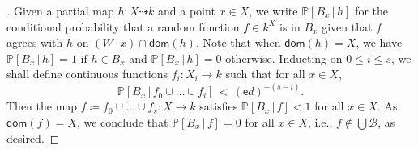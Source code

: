 \documentclass[11pt,reqno,psamsfonts]{amsart}
\theoremstyle{bfnote}
\theoremstyle{definition}
\theoremstyle{remark}
\newcommand{\0}{\varnothing}
\newcommand{\set}[1]{\{#1\}}
\renewcommand{\P}{\mathbb{P}}
\renewcommand{\leq}{\leqslant}
\newcommand{\defeq}{\coloneqq}
\newcommand{\red}[1]{{\color{red}#1}}
\newcommand{\todo}[1]{\red{\textbf{\upshape{[#1]}}}}
\newcommand{\emphd}[1]{{\fontseries{b}\selectfont\textsf{#1}}}
\newcommand{\pto}{\dashrightarrow}
\newcommand{\dom}{\mathsf{dom}}
\newcommand{\Sch}{\mathsf{Sch}}
\numberwithin{equation}{section}
\newenvironment{scproof}[1][]{\begin{proof}[\textsc{\upshape{Proof}}#1]}{\end{proof}}
\begin{document}
\begin{scproof}
        Given a partial map $h \colon X \pto k$ and a point $x \in X$, we write $\P[B_x \,\vert\, h]$ for the conditional probability that a random function $f \in k^X$ is in $B_x$
        given that $f$ agrees with $h$ on $(W \cdot x) \cap \dom(h)$. Note that when $\dom(h) = X$, we have $\P[B_x \,\vert\, h] = 1$ if $h \in B_x$ and $\P[B_x \,\vert\, h] = 0$ otherwise. 
        Inducting on $0 \leq i \leq s$, we shall define continuous functions $f_i \colon X_i \to k$ such that for all $x \in X$,
        \[
            \P[B_x \,\vert\, f_0 \cup \ldots \cup f_i]  \,<\, (\mathsf{e} d)^{-(s - i)}.
        \]
        Then the map $f \defeq f_0 \cup \ldots \cup f_s \colon X \to k$ satisfies $\P[B_x \,\vert\, f] < 1$ for all $x \in X$. As $\dom(f) = X$, we conclude that $\P[B_x \,\vert\, f] = 0$ for all $x \in X$, %
        i.e., $f \notin \bigcup \mathcal{B}$, as desired.


\end{scproof}
\end{document}
